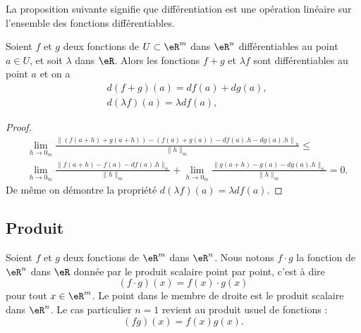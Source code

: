 La proposition suivante signifie que différentiation est une opération linéaire sur l'ensemble des fonctions différentiables. 
\begin{proposition}		\label{PropDiffLineaire}
  Soient $f$ et $g$ deux fonctions de $U\subset\eR^m$ dans $\eR^n$ différentiables au point $a\in U$, et soit $\lambda$ dans $\eR$. Alors les fonctions $f+g$ et $\lambda f$ sont différentiables au point $a$ et on a 
  \begin{equation}
    \begin{aligned}
 &     d(f+g)(a)=df(a)+dg(a), \\
& d(\lambda f)(a)=\lambda df(a),
    \end{aligned}
\end{equation}
\end{proposition}
\begin{proof}
  \begin{equation}
    \begin{aligned}
     & \lim_{h\to 0_m}\frac{\left\|\left(f(a+h)+g(a+h)\right)-\left(f(a)+g(a)\right)-df(a).h-dg(a).h\right\|_n}{\|h\|_m}\leq\\
&\lim_{h\to 0_m}\frac{\|f(a+h)-f(a)-df(a).h\|_n}{\|h\|_m}+\lim_{h\to 0_m}\frac{\|g(a+h)-g(a)-dg(a).h\|_n}{\|h\|_m}=0.
    \end{aligned}
  \end{equation}
  De même on démontre la  propriété $d(\lambda f)(a)=\lambda df(a)$.
\end{proof}

\subsection{Produit}

Soient $f$ et $g$ deux fonctions de $\eR^m$ dans $\eR^n$. Nous notons $f\cdot g$ la fonction de $\eR^n$ dans $\eR$ donnée par le produit scalaire point par point, c'est à dire
\begin{equation}
	(f\cdot g)(x)=f(x)\cdot g(x)
\end{equation}
pour tout $x\in\eR^m$. Le point dans le membre de droite est le produit scalaire dans $\eR^n$. Le cas particulier $n=1$ revient au produit usuel de fonctions :
\begin{equation}
	(fg)(x)=f(x)g(x).
\end{equation}

